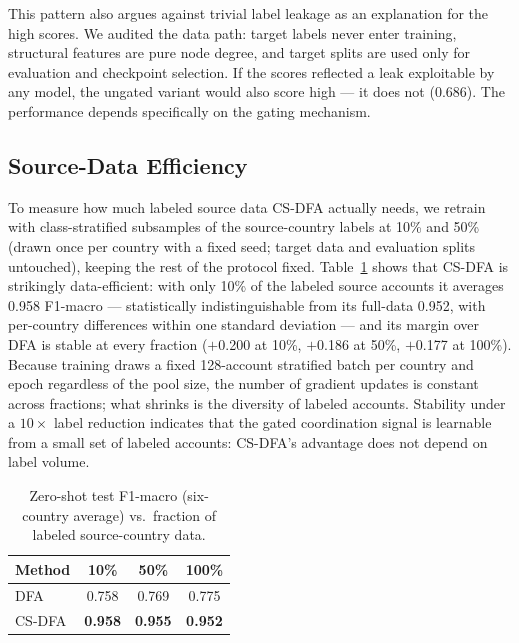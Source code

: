 \documentclass[conference]{IEEEtran}
\newcommand{\method}{CS-DFA}
\begin{document}
This pattern also argues against trivial label leakage as an explanation
for the high scores. We audited the data path: target labels never enter
training, structural features are pure node degree, and target splits are
used only for evaluation and checkpoint selection. If the scores reflected
a leak exploitable by any model, the ungated variant would also score high
--- it does not (0.686). The performance depends specifically on the gating
mechanism.

\subsection{Source-Data Efficiency}
\label{sec:data-efficiency}
To measure how much labeled source data \method{} actually needs, we retrain
with class-stratified subsamples of the source-country labels at 10\% and
50\% (drawn once per country with a fixed seed; target data and evaluation
splits untouched), keeping the rest of the protocol fixed.
Table~\ref{tab:data-eff} shows that \method{} is strikingly data-efficient:
with only 10\% of the labeled source accounts it averages 0.958 F1-macro ---
statistically indistinguishable from its full-data 0.952, with per-country
differences within one standard deviation --- and its margin over DFA is
stable at every fraction ($+$0.200 at 10\%, $+$0.186 at 50\%, $+$0.177 at
100\%). Because training draws a fixed 128-account stratified batch per
country and epoch regardless of the pool size, the number of gradient updates
is constant across fractions; what shrinks is the diversity of labeled
accounts. Stability under a $10\times$ label reduction indicates that the
gated coordination signal is learnable from a small set of labeled accounts:
\method{}'s advantage does not depend on label volume.

\begin{table}[t]
\centering
\caption{Zero-shot test F1-macro (six-country average) vs.\ fraction of
labeled source-country data.}
\label{tab:data-eff}
\begin{tabular}{lccc}
\toprule
Method & 10\% & 50\% & 100\% \\
\midrule
DFA      & 0.758 & 0.769 & 0.775 \\
\method{} & \textbf{0.958} & \textbf{0.955} & \textbf{0.952} \\
\bottomrule
\end{tabular}
\end{table}
\end{document}
